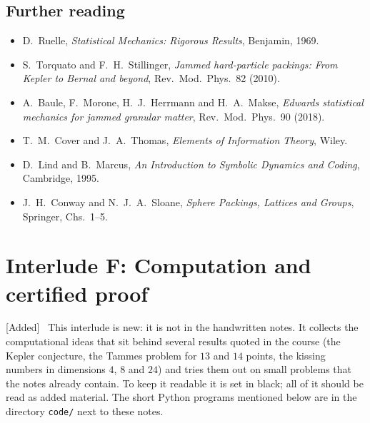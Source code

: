 \documentclass[11pt,openany]{book}
\theoremstyle{plain}
\theoremstyle{definition}
\theoremstyle{remark}
\newenvironment{addedblock}{\par\color{addcol}\noindent\textsf{\small[Added]}\ }{\par}
\begin{document}
\section*{Further reading}
\begin{itemize}[nosep]
\item D.~Ruelle, \emph{Statistical Mechanics: Rigorous Results}, Benjamin, 1969.
\item S.~Torquato and F.~H.~Stillinger, \emph{Jammed hard-particle packings: From Kepler to Bernal and
  beyond}, Rev.\ Mod.\ Phys.\ 82 (2010).
\item A.~Baule, F.~Morone, H.~J.~Herrmann and H.~A.~Makse, \emph{Edwards statistical mechanics for jammed
  granular matter}, Rev.\ Mod.\ Phys.\ 90 (2018).
\item T.~M.~Cover and J.~A.~Thomas, \emph{Elements of Information Theory}, Wiley.
\item D.~Lind and B.~Marcus, \emph{An Introduction to Symbolic Dynamics and Coding}, Cambridge, 1995.
\item J.~H.~Conway and N.~J.~A.~Sloane, \emph{Sphere Packings, Lattices and Groups}, Springer, Chs.~1--5.
\end{itemize}
\endgroup
\begingroup\renewcommand{\thechapter}{F}\renewcommand{\theHchapter}{interludeF}

\chapter[Interlude F: Computation and proof]{Interlude F: Computation and certified proof}
\label{COMP:ch}

\begin{addedblock}
This interlude is new: it is not in the handwritten notes. It collects the computational ideas that
sit behind several results quoted in the course (the Kepler conjecture, the Tammes problem for $13$
and $14$ points, the kissing numbers in dimensions $4$, $8$ and $24$) and tries them out on small
problems that the notes already contain. To keep it readable it is set in black; all of it should be
read as added material. The short Python programs mentioned below are in the directory
\texttt{code/} next to these notes.
\end{addedblock}
\end{document}

